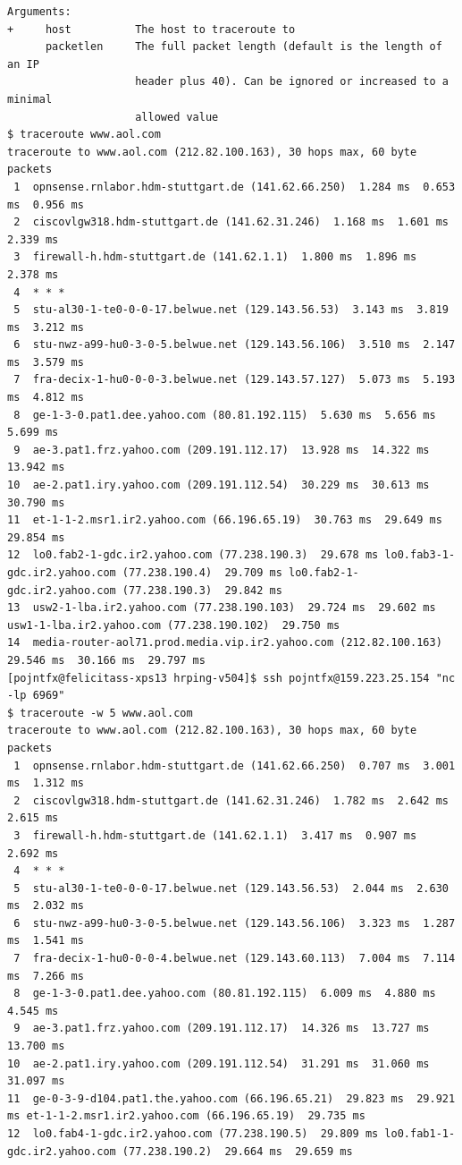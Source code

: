\begin{verbatim}
Arguments:
+     host          The host to traceroute to
      packetlen     The full packet length (default is the length of an IP
                    header plus 40). Can be ignored or increased to a minimal
                    allowed value
$ traceroute www.aol.com
traceroute to www.aol.com (212.82.100.163), 30 hops max, 60 byte packets
 1  opnsense.rnlabor.hdm-stuttgart.de (141.62.66.250)  1.284 ms  0.653 ms  0.956 ms
 2  ciscovlgw318.hdm-stuttgart.de (141.62.31.246)  1.168 ms  1.601 ms  2.339 ms
 3  firewall-h.hdm-stuttgart.de (141.62.1.1)  1.800 ms  1.896 ms  2.378 ms
 4  * * *
 5  stu-al30-1-te0-0-0-17.belwue.net (129.143.56.53)  3.143 ms  3.819 ms  3.212 ms
 6  stu-nwz-a99-hu0-3-0-5.belwue.net (129.143.56.106)  3.510 ms  2.147 ms  3.579 ms
 7  fra-decix-1-hu0-0-0-3.belwue.net (129.143.57.127)  5.073 ms  5.193 ms  4.812 ms
 8  ge-1-3-0.pat1.dee.yahoo.com (80.81.192.115)  5.630 ms  5.656 ms  5.699 ms
 9  ae-3.pat1.frz.yahoo.com (209.191.112.17)  13.928 ms  14.322 ms  13.942 ms
10  ae-2.pat1.iry.yahoo.com (209.191.112.54)  30.229 ms  30.613 ms  30.790 ms
11  et-1-1-2.msr1.ir2.yahoo.com (66.196.65.19)  30.763 ms  29.649 ms  29.854 ms
12  lo0.fab2-1-gdc.ir2.yahoo.com (77.238.190.3)  29.678 ms lo0.fab3-1-gdc.ir2.yahoo.com (77.238.190.4)  29.709 ms lo0.fab2-1-gdc.ir2.yahoo.com (77.238.190.3)  29.842 ms
13  usw2-1-lba.ir2.yahoo.com (77.238.190.103)  29.724 ms  29.602 ms usw1-1-lba.ir2.yahoo.com (77.238.190.102)  29.750 ms
14  media-router-aol71.prod.media.vip.ir2.yahoo.com (212.82.100.163)  29.546 ms  30.166 ms  29.797 ms
[pojntfx@felicitass-xps13 hrping-v504]$ ssh pojntfx@159.223.25.154 "nc -lp 6969"
$ traceroute -w 5 www.aol.com
traceroute to www.aol.com (212.82.100.163), 30 hops max, 60 byte packets
 1  opnsense.rnlabor.hdm-stuttgart.de (141.62.66.250)  0.707 ms  3.001 ms  1.312 ms
 2  ciscovlgw318.hdm-stuttgart.de (141.62.31.246)  1.782 ms  2.642 ms  2.615 ms
 3  firewall-h.hdm-stuttgart.de (141.62.1.1)  3.417 ms  0.907 ms  2.692 ms
 4  * * *
 5  stu-al30-1-te0-0-0-17.belwue.net (129.143.56.53)  2.044 ms  2.630 ms  2.032 ms
 6  stu-nwz-a99-hu0-3-0-5.belwue.net (129.143.56.106)  3.323 ms  1.287 ms  1.541 ms
 7  fra-decix-1-hu0-0-0-4.belwue.net (129.143.60.113)  7.004 ms  7.114 ms  7.266 ms
 8  ge-1-3-0.pat1.dee.yahoo.com (80.81.192.115)  6.009 ms  4.880 ms  4.545 ms
 9  ae-3.pat1.frz.yahoo.com (209.191.112.17)  14.326 ms  13.727 ms  13.700 ms
10  ae-2.pat1.iry.yahoo.com (209.191.112.54)  31.291 ms  31.060 ms  31.097 ms
11  ge-0-3-9-d104.pat1.the.yahoo.com (66.196.65.21)  29.823 ms  29.921 ms et-1-1-2.msr1.ir2.yahoo.com (66.196.65.19)  29.735 ms
12  lo0.fab4-1-gdc.ir2.yahoo.com (77.238.190.5)  29.809 ms lo0.fab1-1-gdc.ir2.yahoo.com (77.238.190.2)  29.664 ms  29.659 ms

\end{verbatim}
